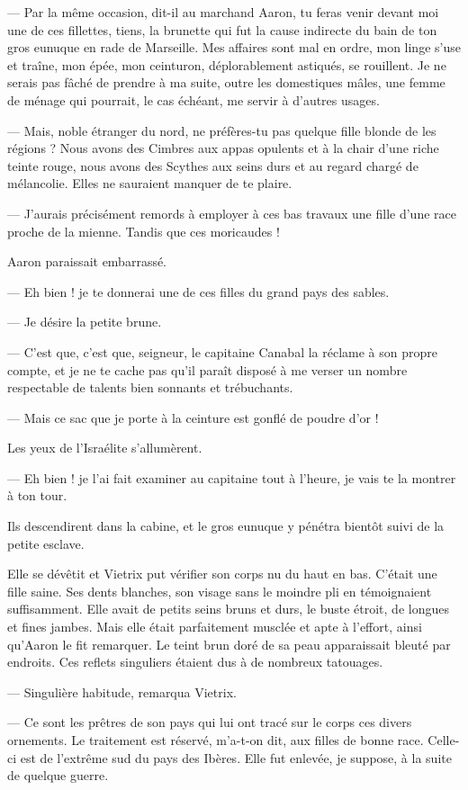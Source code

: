 \documentclass[a4paper, 11pt, oneside, polutonikogreek, french]{article}
\begin{document}
--- Par la même occasion, dit-il au marchand Aaron, tu feras venir devant moi une de ces fillettes, tiens, la brunette qui fut la cause indirecte du bain de ton gros eunuque en rade de Marseille. Mes affaires sont mal en ordre, mon linge s'use et traîne, mon épée, mon ceinturon, déplorablement astiqués, se rouillent. Je ne serais pas fâché de prendre à ma suite, outre les domestiques mâles, une femme de ménage qui pourrait, le cas échéant, me servir à d'autres usages.

--- Mais, noble étranger du nord, ne préfères-tu pas quelque fille blonde de les régions ? Nous avons des Cimbres aux appas opulents et à la chair d'une riche teinte rouge, nous avons des Scythes aux seins durs et au regard chargé de mélancolie. Elles ne sauraient manquer de te plaire.

--- J'aurais précisément remords à employer à ces bas travaux une fille d'une race proche de la mienne. Tandis que ces moricaudes !

Aaron paraissait embarrassé.

--- Eh bien ! je te donnerai une de ces filles du grand pays des sables.

--- Je désire la petite brune.

--- C'est que, c'est que, seigneur, le capitaine Canabal la réclame à son propre compte, et je ne te cache pas qu'il paraît disposé à me verser un nombre respectable de talents bien sonnants et trébuchants.

--- Mais ce sac que je porte à la ceinture est gonflé de poudre d'or !

Les yeux de l'Israélite s'allumèrent.

--- Eh bien ! je l'ai fait examiner au capitaine tout à l'heure, je vais te la montrer à ton tour.

Ils descendirent dans la cabine, et le gros eunuque y pénétra bientôt suivi de la petite esclave.

Elle se dévêtit et Vietrix put vérifier son corps nu du haut en bas. C'était une fille saine. Ses dents blanches, son visage sans le moindre pli en témoignaient suffisamment. Elle avait de petits seins bruns et durs, le buste étroit, de longues et fines jambes. Mais elle était parfaitement musclée et apte à l'effort, ainsi qu'Aaron le fit remarquer. Le teint brun doré de sa peau apparaissait bleuté par endroits. Ces reflets singuliers étaient dus à de nombreux tatouages.

--- Singulière habitude, remarqua Vietrix.

--- Ce sont les prêtres de son pays qui lui ont tracé sur le corps ces divers ornements. Le traitement est réservé, m'a-t-on dit, aux filles de bonne race. Celle-ci est de l'extrême sud du pays des Ibères. Elle fut enlevée, je suppose, à la suite de quelque guerre.
\end{document}
